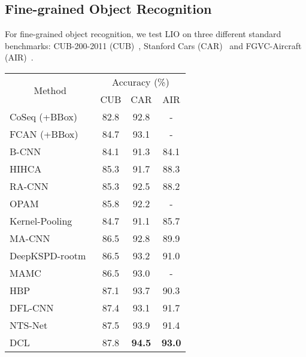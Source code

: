 \documentclass[10pt,twocolumn,letterpaper]{article}
\begin{document}
\subsection{Fine-grained Object Recognition}
For fine-grained object recognition, we test LIO on three different standard benchmarks: CUB-200-2011 (CUB)~\cite{CUB}, Stanford Cars (CAR)~\cite{CAR} and FGVC-Aircraft (AIR)~\cite{AIR}.

\begin{table}[!t]
\small
\begin{center}
    \begin{tabular}{|l|c|c|c|}
    \hline
    \multicolumn{1}{|c|}{\multirow{2}{*}{Method}}  & \multicolumn{3}{c|}{Accuracy (\%)}  \\ \cline{2-4} 
    \multicolumn{1}{|c|}{} & CUB & CAR & AIR \\ \hline\hline
    CoSeq (+BBox)~\cite{CoSeq} & 82.8         & 92.8          & -             \\
    FCAN (+BBox)~\cite{liu2016fully}   & 84.7         & 93.1          & -             \\\hline
    B-CNN~\cite{BCNN}  & 84.1         & 91.3          & 84.1          \\
    HIHCA~\cite{cai2017higher}  & 85.3         & 91.7          & 88.3          \\
    RA-CNN~\cite{RACNN}  & 85.3         & 92.5          & 88.2          \\
    OPAM~\cite{OPAM}  & 85.8         & 92.2          & -             \\
    Kernel-Pooling~\cite{cui2017kernel}  & 84.7         & 91.1          & 85.7          \\
    MA-CNN~\cite{zheng2017learning}  & 86.5         & 92.8          & 89.9          \\
    DeepKSPD-rootm~\cite{engin2018deepkspd} & 86.5         & 93.2          & 91.0          \\
    MAMC~\cite{MAMC}   & 86.5         & 93.0          & -             \\
    HBP~\cite{yu2018hierarchical}  & 87.1         & 93.7          & 90.3          \\
    DFL-CNN~\cite{wang2018learning} & 87.4         & 93.1          & 91.7          \\
    NTS-Net~\cite{yang2018learning}  & 87.5         & 93.9          & 91.4          \\
    DCL~\cite{chen2019destruction} & 87.8 & \textbf{94.5} & \textbf{93.0} \\
    \hline\hline

\end{tabular}
\end{center}
\end{table}
\end{document}
